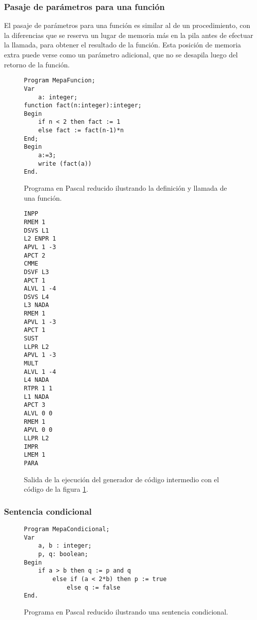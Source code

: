 \subsubsection{Pasaje de parámetros para una función}
El pasaje de parámetros para una función es similar al de un procedimiento, con la diferencias que se reserva un lugar de memoria más en la pila antes de efectuar la llamada, para obtener el resultado de la función. Esta posición de memoria extra puede verse como un parámetro adicional, que no se desapila luego del retorno de la función.

\begin{figure}[H]
\begin{verbatim}
Program MepaFuncion;
Var
    a: integer;
function fact(n:integer):integer;
Begin
    if n < 2 then fact := 1
    else fact := fact(n-1)*n
End;
Begin
    a:=3;
    write (fact(a))
End.
\end{verbatim}
\caption{Programa en Pascal reducido ilustrando la definición y llamada de una función.}
\label{fig:ej_funcion}
\end{figure}

\begin{figure}[H]
\begin{multicols}{3}
\begin{verbatim}
INPP
RMEM 1
DSVS L1
L2 ENPR 1
APVL 1 -3
APCT 2
CMME
DSVF L3
APCT 1
ALVL 1 -4
DSVS L4
L3 NADA
RMEM 1
APVL 1 -3
APCT 1
SUST
LLPR L2
APVL 1 -3
MULT
ALVL 1 -4
L4 NADA
RTPR 1 1
L1 NADA
APCT 3
ALVL 0 0
RMEM 1
APVL 0 0
LLPR L2
IMPR
LMEM 1
PARA
\end{verbatim}
\end{multicols}
\caption{Salida de la ejecución del generador de código intermedio con el código de la figura \ref{fig:ej_funcion}.}
\label{fig:gen_ej_funcion}
\end{figure}

\subsubsection{Sentencia condicional}
\begin{figure}[H]
\begin{verbatim}
Program MepaCondicional;
Var
    a, b : integer;
    p, q: boolean;
Begin
    if a > b then q := p and q
        else if (a < 2*b) then p := true
            else q := false
End.
\end{verbatim}
\caption{Programa en Pascal reducido ilustrando una sentencia condicional.}
\label{fig:ej_if_then_else}
\end{figure}


